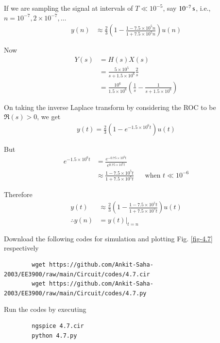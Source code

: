 \documentclass[journal,12pt,twocolumn]{IEEEtran}
\providecommand{\brak}[1]{\ensuremath{\left(#1\right)}}
\numberwithin{equation}{section}
\numberwithin{figure}{section}
\renewcommand\thesection{\arabic{section}}
\begin{document}
\begin{enumerate}[label=\thesection.\arabic*.,ref=\thesection.\theenumi]
	If we are sampling the signal at intervals of $T \ll 10^{-5}$, say $\SI[parse-numbers=false]{10^{-7}}{\second}$, i.e., $n = 10^{-7}, 2\times10^{-7},\ldots$
	\begin{align}
		y(n) &\approx \frac{2}{3} \brak{1 - \frac{1-7.5\times10^5n}{1+7.5\times10^5n}}u(n)
	\end{align}
	
	Now
	\begin{align}
		Y(s) &= H(s)X(s) \\
		&= \frac{5\times10^5}{s+1.5\times10^6} \frac{2}{s} \\
		&= \frac{10^6}{1.5\times10^6} \brak{\frac{1}{s} - \frac{1}{s+1.5\times10^6}}
	\end{align}
	
	On taking the inverse Laplace transform by considering the ROC to be $\Re(s) > 0$, we get
	\begin{align}
		y(t) = \frac{2}{3}\brak{1 - e^{-1.5\times10^6t}}u(t)
	\end{align}
	
	But 
	\begin{align}
		e^{-1.5\times 10^6 t} &= \frac{e^{-0.75 \times 10^6 t}}{e^{0.75 \times 10^6 t}} \\
		&\approx \frac{1-7.5\times10^5t}{1+7.5\times10^5t} && \text{when } t \ll 10^{-6} 
	\end{align}
	
	Therefore
	\begin{align}
		y(t) &\approx \frac{2}{3} \brak{1 - \frac{1-7.5\times10^5t}{1+7.5\times10^5t}} u(t) \\
		\therefore y(n) &= y(t)|_{t=n}
	\end{align}
	
	Download the following codes for simulation and plotting Fig. \ref{fig-4.7} respectively
	\begin{lstlisting}
		wget https://github.com/Ankit-Saha-2003/EE3900/raw/main/Circuit/codes/4.7.cir
		wget https://github.com/Ankit-Saha-2003/EE3900/raw/main/Circuit/codes/4.7.py
	\end{lstlisting}
	
	Run the codes by executing
	\begin{lstlisting}
		ngspice 4.7.cir
		python 4.7.py
	\end{lstlisting}	
	

\end{enumerate}
\end{document}
